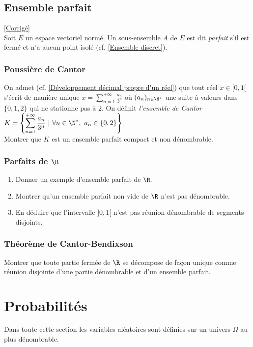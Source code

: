 \documentclass[8pt]{book}
\begin{document}
\section{Ensemble parfait}
\label{Ensemble parfait}
\textcolor{blue}{\hyperref[Ensemble parfait corrigé]{[Corrigé]}}\\
Soit $E$ un espace vectoriel normé. Un sous-ensemble $A$ de $E$ est dit \textit{parfait} s'il est fermé et n'a aucun point isolé (cf. \ref{Ensemble discret}).

\subsection{Poussière de Cantor}
On admet (cf. \ref{Développement décimal propre d'un réel}) que tout réel $x\in [0,1[$ s'écrit de manière unique $x=\displaystyle\sum_{n=1}^{+\infty}\frac{a_n}{3^n}$ où $(a_n)_{n\in \N^*}$ une suite à valeurs dans $\{0,1,2\}$ qui ne stationne pas à $2$. On définit \textit{l'ensemble de Cantor} $K=\displaystyle\left\{\sum_{n=1}^{+\infty}\frac{a_n}{3^n}\ |\ \forall n\in \N^*,\ a_n\in \{0,2\}\right\}$.\\
Montrer que $K$ est un ensemble parfait compact et non dénombrable.

\subsection{Parfaits de $\R$}
\begin{enumerate}[leftmargin=*]
	\item Donner un exemple d'ensemble parfait de $\R$.
	\item Montrer qu'un ensemble parfait non vide de $\R$ n'est pas dénombrable.
	\item En déduire que l'intervalle $]0,1[$ n'est pas réunion dénombrable de segments disjoints.
\end{enumerate}

\subsection{Théorème de Cantor-Bendixson}
Montrer que toute partie fermée de $\R$ se décompose de façon unique comme réunion disjointe d'une partie dénombrable et d'un ensemble parfait.

\chapter{Probabilités}
Dans toute cette section les variables aléatoires sont définies sur un univers $\Omega$ au plus dénombrable.\\
\end{document}
